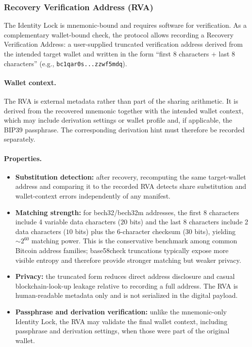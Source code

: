 \documentclass[11pt]{article}
\begin{document}
\subsubsection{Recovery Verification Address (RVA)}
\label{sec:rva}

The Identity Lock is mnemonic-bound and requires software for verification. As a complementary wallet-bound check, the protocol allows recording a Recovery Verification Address: a user-supplied truncated verification address derived from the intended target wallet and written in the form ``first 8 characters + last 8 characters'' (e.g., \texttt{bc1qar0s...zzwf5mdq}).

\paragraph{Wallet context.}
The RVA is external metadata rather than part of the sharing arithmetic. It is derived from the recovered mnemonic together with the intended wallet context, which may include derivation settings or wallet profile and, if applicable, the BIP39 passphrase. The corresponding derivation hint must therefore be recorded separately.

\paragraph{Properties.}
\begin{itemize}[noitemsep]
    \item \textbf{Substitution detection:} after recovery, recomputing the same target-wallet address and comparing it to the recorded RVA detects share substitution and wallet-context errors independently of any manifest.
    \item \textbf{Matching strength:} for bech32/bech32m addresses, the first 8 characters include 4 variable data characters ($20$ bits) and the last 8 characters include 2 data characters ($10$ bits) plus the 6-character checksum ($30$ bits), yielding ${\sim}2^{60}$ matching power. This is the conservative benchmark among common Bitcoin address families; base58check truncations typically expose more visible entropy and therefore provide stronger matching but weaker privacy.
    \item \textbf{Privacy:} the truncated form reduces direct address disclosure and casual blockchain-look-up leakage relative to recording a full address. The RVA is human-readable metadata only and is not serialized in the digital payload.
    \item \textbf{Passphrase and derivation verification:} unlike the mnemonic-only Identity Lock, the RVA may validate the final wallet context, including passphrase and derivation settings, when those were part of the original wallet.
\end{itemize}
\end{document}
